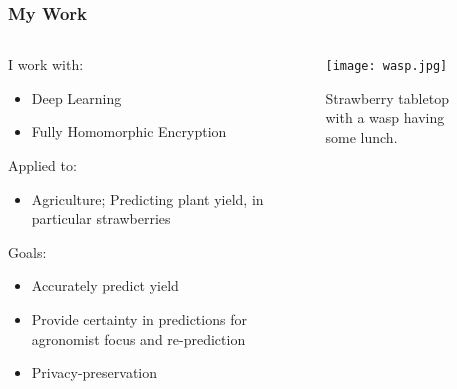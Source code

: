 \documentclass[aspectratio=169]{beamer}
\begin{document}
  \begin{frame}
    \frametitle{My Work}
    \begin{columns}
      \begin{column}{0.5\textwidth}
        I work with:
        \begin{itemize}
          \item Deep Learning
          \item Fully Homomorphic Encryption \autocite{gentry2009fully}
        \end{itemize}
        Applied to:
        \begin{itemize}
          \item Agriculture; Predicting plant yield, in particular strawberries
        \end{itemize}
        Goals:
        \begin{itemize}
          \item Accurately predict yield
          \item Provide certainty in predictions for agronomist focus and re-prediction
          \item Privacy-preservation
        \end{itemize}
      \end{column}
      \begin{column}{0.5\textwidth}
        \begin{figure}[th!]
          \centering
          \texttt{[image: wasp.jpg]}
          \caption{Strawberry tabletop with a wasp having some lunch. \autocite{repository}}
          \label{fig:wasp}
        \end{figure}
      \end{column}
    \end{columns}
  \end{frame}
\end{document}
